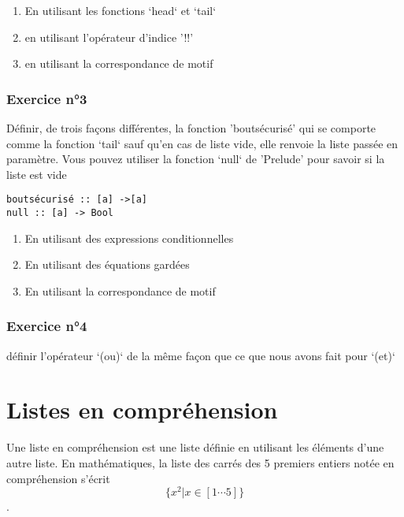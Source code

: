 \documentclass[11pt]{article}
\begin{document}
\begin{enumerate}
\item En utilisant les fonctions `head` et `tail`
\label{sec:org4ce89ea}

\item en utilisant l'opérateur d'indice '!!'
\label{sec:orgdf1dbd8}

\item en utilisant la correspondance de motif
\label{sec:orgb813d1c}
\end{enumerate}

\subsubsection{Exercice n°3}
\label{sec:orgde7dee9}
Définir,  de trois façons différentes, la fonction 'boutsécurisé' qui se comporte comme la fonction `tail`  sauf qu'en cas de liste vide, elle renvoie la liste passée en paramètre.   Vous pouvez utiliser la fonction `null` de 'Prelude' pour savoir si la liste est vide
\begin{verbatim}
boutsécurisé :: [a] ->[a]
null :: [a] -> Bool
\end{verbatim}

\begin{enumerate}
\item En utilisant des expressions conditionnelles
\label{sec:orgef01bf4}

\item En utilisant des équations gardées
\label{sec:orgf45df81}

\item En utilisant la correspondance de motif
\label{sec:orgbb495d0}
\end{enumerate}

\subsubsection{Exercice n°4}
\label{sec:org6e50572}
définir l'opérateur `(ou)` de la même façon que ce que nous avons fait pour `(et)`

\section{Listes en compréhension}
\label{sec:org3ebd5dd}
Une liste en compréhension est une liste définie en utilisant les éléments d'une autre liste.  En mathématiques, la liste des carrés des 5 premiers entiers notée en compréhension s'écrit $$\{x^2 | x \in [1\cdots{} 5]\}$$.
\end{document}

